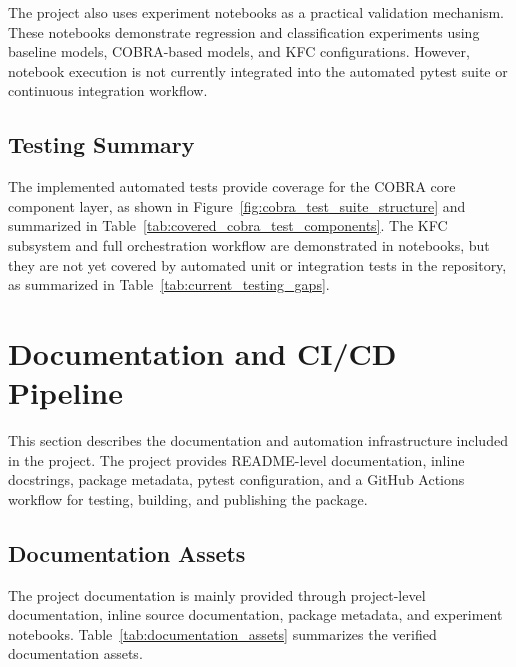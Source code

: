 \hs The project also uses experiment notebooks as a practical validation mechanism. These notebooks demonstrate regression and classification experiments using baseline models, COBRA-based models, and KFC configurations. However, notebook execution is not currently integrated into the automated pytest suite or continuous integration workflow.

\subsection{Testing Summary}

\hs The implemented automated tests provide coverage for the COBRA core component layer, as shown in Figure~\ref{fig:cobra_test_suite_structure} and summarized in Table~\ref{tab:covered_cobra_test_components}. The KFC subsystem and full orchestration workflow are demonstrated in notebooks, but they are not yet covered by automated unit or integration tests in the repository, as summarized in Table~\ref{tab:current_testing_gaps}.

\section{Documentation and CI/CD Pipeline}
\label{sec:documentation_cicd}

\hs This section describes the documentation and automation infrastructure included in the project. The project provides README-level documentation, inline docstrings, package metadata, pytest configuration, and a GitHub Actions workflow for testing, building, and publishing the package.

\subsection{Documentation Assets}

\hs The project documentation is mainly provided through project-level documentation, inline source documentation, package metadata, and experiment notebooks. Table~\ref{tab:documentation_assets} summarizes the verified documentation assets.

